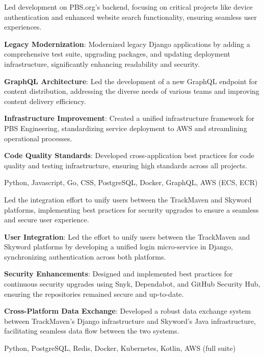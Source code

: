 \documentclass{bluefin_cv}
\begin{document}
{
  Led development on PBS.org's backend, focusing on critical projects like device authentication and enhanced website search functionality, ensuring seamless user experiences.
}
{
  \item {\bf Legacy Modernization}: Modernized legacy Django applications by adding a comprehensive test suite, upgrading packages, and updating deployment infrastructure, significantly enhancing readability and security.
  \item {\bf GraphQL Architecture}: Led the development of a new GraphQL endpoint for content distribution, addressing the diverse needs of various teams and improving content delivery efficiency.
  \item {\bf Infrastructure Improvement}: Created a unified infrastructure framework for PBS Engineering, standardizing service deployment to AWS and streamlining operational processes.
  \item {\bf Code Quality Standards}: Developed cross-application best practices for code quality and testing infrastructure, ensuring high standards across all projects.
}
{
  Python,
  Javascript,
  Go,
  CSS,
  PostgreSQL,
  Docker,
  GraphQL,
  AWS (ECS, ECR)
}

{
  Led the integration effort to unify users between the TrackMaven and Skyword platforms, implementing best practices for security upgrades to ensure a seamless and secure user experience.
}
{
  \item {\bf User Integration}: Led the effort to unify users between the TrackMaven and Skyword platforms by developing a unified login micro-service in Django, synchronizing authentication across both platforms.
  \item {\bf Security Enhancements}: Designed and implemented best practices for continuous security upgrades using Snyk, Dependabot, and GitHub Security Hub, ensuring the repositories remained secure and up-to-date.
  \item {\bf Cross-Platform Data Exchange}: Developed a robust data exchange system between TrackMaven’s Django infrastructure and Skyword’s Java infrastructure, facilitating seamless data flow between the two systems.
}
{
  Python,
  PostgreSQL,
  Redis,
  Docker,
  Kubernetes,
  Kotlin,
  AWS (full suite)
}
\end{document}
